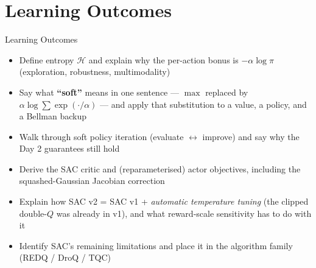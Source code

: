 \section{Learning Outcomes}
\begin{frame}{Learning Outcomes}
    \begin{itemize}
        \setlength{\itemsep}{0.5em}
        \item Define entropy $\mathcal{H}$ and explain why the per-action bonus is $-\alpha\log\pi$ (exploration, robustness, multimodality)
        \item Say what \textbf{``soft''} means in one sentence --- $\max$ replaced by $\alpha\log\sum\exp(\cdot/\alpha)$ --- and apply that substitution to a value, a policy, and a Bellman backup
        \item Walk through soft policy iteration (evaluate $\leftrightarrow$ improve) and say why the Day 2 guarantees still hold
        \item Derive the SAC critic and (reparameterised) actor objectives, including the squashed-Gaussian Jacobian correction
        \item Explain how SAC v2 = SAC v1 + \emph{automatic temperature tuning} (the clipped double-$Q$ was already in v1), and what reward-scale sensitivity has to do with it
        \item Identify SAC's remaining limitations and place it in the algorithm family (REDQ / DroQ / TQC)
    \end{itemize}
\end{frame}
